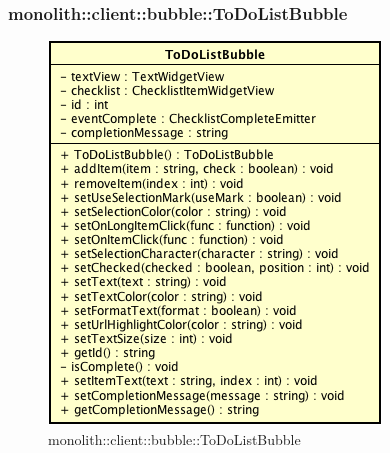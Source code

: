 \subsubsection{monolith::client::bubble::ToDoListBubble}

\label{monolith::client::bubble::ToDoListBubble}
\begin{figure}[H]
	\centering
	\includegraphics[scale=0.5]{Sezioni/SottosezioniST/img/ToDoListBubble.png}
	\caption{monolith::client::bubble::ToDoListBubble}
\end{figure}

